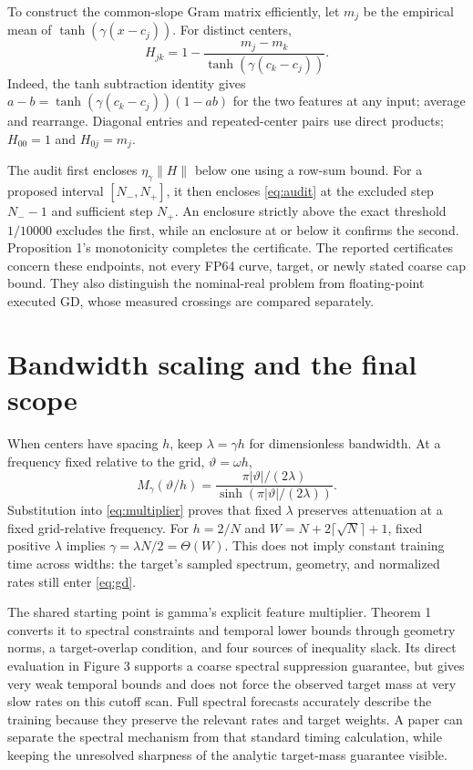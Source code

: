 \documentclass[11pt]{article}
\theoremstyle{definition}
\begin{document}
To construct the common-slope Gram matrix efficiently, let $m_j$ be the
empirical mean of $\tanh(\gamma(x-c_j))$. For distinct centers,
\begin{equation*}
 H_{jk}=1-\frac{m_j-m_k}{\tanh(\gamma(c_k-c_j))}.
\end{equation*}
Indeed, the tanh subtraction identity gives
$a-b=\tanh(\gamma(c_k-c_j))(1-ab)$ for the two features at any input;
average and rearrange. Diagonal entries and repeated-center pairs use direct
products; $H_{00}=1$ and $H_{0j}=m_j$.

The audit first encloses $\eta_\gamma\|H\|$ below one using a row-sum bound.
For a proposed interval $[N_-,N_+]$, it then encloses \eqref{eq:audit} at the
excluded step $N_--1$ and sufficient step $N_+$. An enclosure strictly above the exact threshold $1/10000$
excludes the first, while an enclosure at or below it confirms the second.
Proposition 1's monotonicity completes the certificate. The reported
certificates concern these endpoints, not every FP64 curve, target, or newly
stated coarse cap bound. They also distinguish the nominal-real problem from
floating-point executed GD, whose measured crossings are compared separately.

\section{Bandwidth scaling and the final scope}
When centers have spacing $h$, keep $\lambda=\gamma h$ for dimensionless
bandwidth. At a frequency fixed relative to the grid, $\vartheta=\omega h$,
\begin{equation*}
 M_\gamma(\vartheta/h)=
 \frac{\pi|\vartheta|/(2\lambda)}{\sinh(\pi|\vartheta|/(2\lambda))}.
\end{equation*}
Substitution into \eqref{eq:multiplier} proves that fixed $\lambda$ preserves
attenuation at a fixed grid-relative frequency. For $h=2/N$ and
$W=N+2\lceil\sqrt N\rceil+1$, fixed positive $\lambda$ implies
$\gamma=\lambda N/2=\Theta(W)$. This does not imply constant training time
across widths: the target's sampled spectrum, geometry, and normalized rates
still enter \eqref{eq:gd}.

The shared starting point is gamma's explicit feature multiplier. Theorem 1
converts it to spectral constraints and temporal lower bounds through geometry
norms, a target-overlap condition, and four sources of inequality slack.
Its direct evaluation in Figure 3 supports a coarse spectral suppression
guarantee, but gives very weak temporal bounds and does not force the observed
target mass at very slow rates on this cutoff scan. Full spectral forecasts
accurately describe the training because they preserve the relevant rates and
target weights. A paper can separate the spectral mechanism from that standard
timing calculation, while keeping the unresolved sharpness of the analytic
target-mass guarantee visible.
\end{document}
